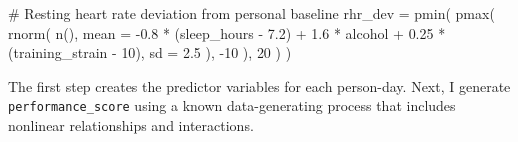 \documentclass[
  letterpaper,
  DIV=11,
  numbers=noendperiod]{scrreprt}
\newenvironment{Shaded}{\begin{snugshade}}{\end{snugshade}}
\newcommand{\AttributeTok}[1]{\textcolor[rgb]{0.40,0.45,0.13}{#1}}
\newcommand{\CommentTok}[1]{\textcolor[rgb]{0.37,0.37,0.37}{#1}}
\newcommand{\DecValTok}[1]{\textcolor[rgb]{0.68,0.00,0.00}{#1}}
\newcommand{\FloatTok}[1]{\textcolor[rgb]{0.68,0.00,0.00}{#1}}
\newcommand{\FunctionTok}[1]{\textcolor[rgb]{0.28,0.35,0.67}{#1}}
\newcommand{\NormalTok}[1]{\textcolor[rgb]{0.00,0.23,0.31}{#1}}
\newcommand{\SpecialCharTok}[1]{\textcolor[rgb]{0.37,0.37,0.37}{#1}}
\begin{document}
\begin{Shaded}
\begin{Highlighting}[]
    \CommentTok{\# Resting heart rate deviation from personal baseline}
    \AttributeTok{rhr\_dev =} \FunctionTok{pmin}\NormalTok{(}
      \FunctionTok{pmax}\NormalTok{(}
        \FunctionTok{rnorm}\NormalTok{(}
          \FunctionTok{n}\NormalTok{(),}
          \AttributeTok{mean =} \SpecialCharTok{{-}}\FloatTok{0.8} \SpecialCharTok{*}\NormalTok{ (sleep\_hours }\SpecialCharTok{{-}} \FloatTok{7.2}\NormalTok{) }\SpecialCharTok{+}
            \FloatTok{1.6} \SpecialCharTok{*}\NormalTok{ alcohol }\SpecialCharTok{+}
            \FloatTok{0.25} \SpecialCharTok{*}\NormalTok{ (training\_strain }\SpecialCharTok{{-}} \DecValTok{10}\NormalTok{),}
          \AttributeTok{sd =} \FloatTok{2.5}
\NormalTok{        ),}
        \SpecialCharTok{{-}}\DecValTok{10}
\NormalTok{      ),}
      \DecValTok{20}
\NormalTok{    )}
\NormalTok{  )}
\end{Highlighting}
\end{Shaded}

The first step creates the predictor variables for each person-day.
Next, I generate \texttt{performance\_score} using a known
data-generating process that includes nonlinear relationships and
interactions.
\end{document}
